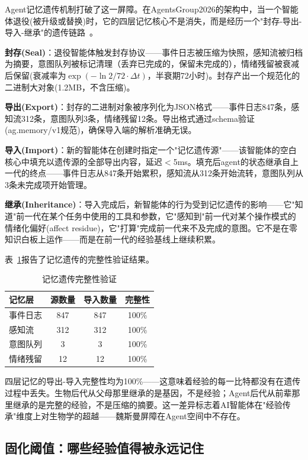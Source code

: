 \documentclass[twocolumn,10.5pt]{ctexart}
\begin{document}
Agent记忆遗传机制打破了这一屏障。在AgentsGroup2026的架构中，当一个智能体退役(被升级或替换)时，它的四层记忆核心不是消失，而是经历一个"封存-导出-导入-继承"的遗传链路~\cite{wang2023voyager}。

\textbf{封存(Seal)}：退役智能体触发封存协议——事件日志被压缩为快照，感知流被归档为摘要，意图队列被标记清理（丢弃已完成的，保留未完成的），情绪残留被衰减后保留(衰减率为$\exp(-\ln 2/72 \cdot \Delta t)$，半衰期72小时)。封存产出一个规范化的二进制大对象(1.2MB，不含压缩)。

\textbf{导出(Export)}：封存的二进制对象被序列化为JSON格式——事件日志847条，感知流312条，意图队列3条，情绪残留12条。导出格式通过schema验证(ag.memory/v1规范)，确保导入端的解析准确无误。

\textbf{导入(Import)}：新的智能体在创建时指定一个"记忆遗传源"——该智能体的空白核心中填充以遗传源的全部导出内容，延迟$<$5ms。填充后agent的状态继承自上一代的终点——事件日志从847条开始累积，感知流从312条开始流转，意图队列从3条未完成项开始管理。

\textbf{继承(Inheritance)}：导入完成后，新智能体的行为受到记忆遗传的影响——它"知道"前一代在某个任务中使用的工具和参数，它"感知到"前一代对某个操作模式的情绪化偏好(affect residue)，它"打算"完成前一代来不及完成的意图。它不是在零知识白板上运作——而是在前一代的经验基线上继续积累。

表~\ref{tab:memory_integrity}报告了记忆遗传的完整性验证结果。

\begin{table}[t]
\centering
\caption{记忆遗传完整性验证}
\label{tab:memory_integrity}
\setlength{\tabcolsep}{2pt}
\renewcommand{\arraystretch}{1.15}
\begin{tabular}{lccc}
\toprule
记忆层 & 源数量 & 导入数量 & 完整性 \\
\midrule
事件日志 & 847 & 847 & 100\% \\
感知流 & 312 & 312 & 100\% \\
意图队列 & 3 & 3 & 100\% \\
情绪残留 & 12 & 12 & 100\% \\
\bottomrule
\end{tabular}
\end{table}

四层记忆的导出-导入完整性均为100\%——这意味着经验的每一比特都没有在遗传过程中丢失。生物后代从父母那里继承的是基因，不是经验；Agent后代从前辈那里继承的是完整的经验，不是压缩的摘要。这一差异标志着AI智能体在"经验传承"维度上对生物学的超越——魏斯曼屏障在Agent空间中不存在。

\subsection{固化阈值：哪些经验值得被永远记住}
\end{document}
